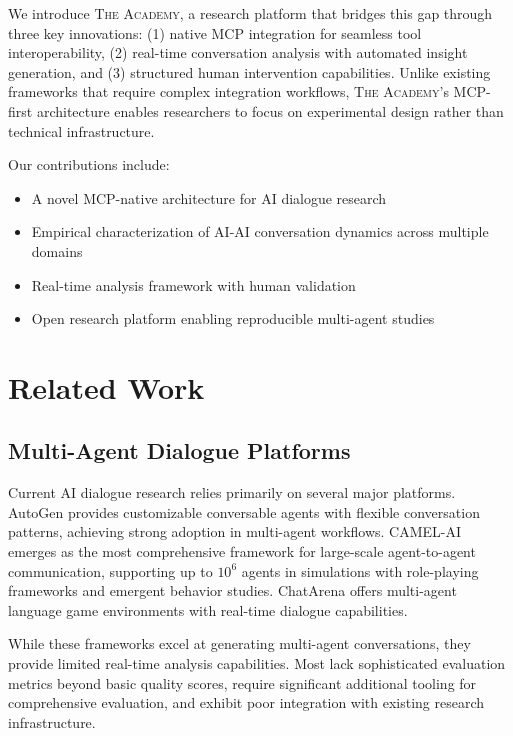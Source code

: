 \documentclass{article}
\newcommand{\theacademy}{\textsc{The Academy}}
\newcommand{\mcp}{\textsc{MCP}}
\begin{document}
We introduce \theacademy{}, a research platform that bridges this gap through three key innovations: (1) native \mcp{} integration for seamless tool interoperability, (2) real-time conversation analysis with automated insight generation, and (3) structured human intervention capabilities. Unlike existing frameworks that require complex integration workflows, \theacademy{}'s \mcp{}-first architecture enables researchers to focus on experimental design rather than technical infrastructure.

Our contributions include:
\begin{itemize}
    \item A novel \mcp{}-native architecture for AI dialogue research
    \item Empirical characterization of AI-AI conversation dynamics across multiple domains
    \item Real-time analysis framework with human validation
    \item Open research platform enabling reproducible multi-agent studies
\end{itemize}

\section{Related Work}

\subsection{Multi-Agent Dialogue Platforms}

Current AI dialogue research relies primarily on several major platforms. AutoGen \citep{wu2023autogen} provides customizable conversable agents with flexible conversation patterns, achieving strong adoption in multi-agent workflows. CAMEL-AI \citep{li2023camel} emerges as the most comprehensive framework for large-scale agent-to-agent communication, supporting up to $10^6$ agents in simulations with role-playing frameworks and emergent behavior studies. ChatArena \citep{chen2023chatarena} offers multi-agent language game environments with real-time dialogue capabilities.

While these frameworks excel at generating multi-agent conversations, they provide limited real-time analysis capabilities. Most lack sophisticated evaluation metrics beyond basic quality scores, require significant additional tooling for comprehensive evaluation, and exhibit poor integration with existing research infrastructure.
\end{document}
